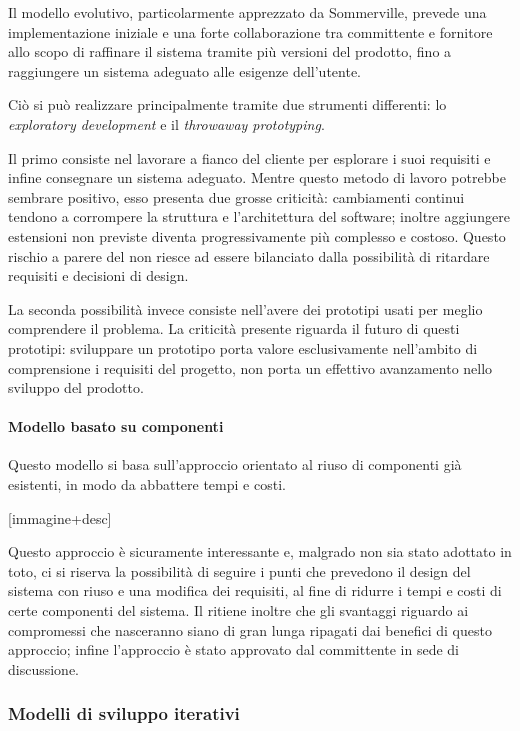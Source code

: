 			Il modello evolutivo, particolarmente apprezzato da Sommerville, prevede una implementazione iniziale e una forte collaborazione tra committente e fornitore allo scopo di raffinare il sistema tramite più versioni del prodotto, fino a raggiungere un sistema adeguato alle esigenze dell'utente.

Ciò si può realizzare principalmente tramite due strumenti differenti: lo \textit{exploratory development} e il \textit{throwaway prototyping}.

Il primo consiste nel lavorare a fianco del cliente per esplorare i suoi requisiti e infine consegnare un sistema adeguato. Mentre questo metodo di lavoro potrebbe sembrare positivo, esso presenta due grosse criticità: cambiamenti continui tendono a corrompere la struttura e l'architettura del software; inoltre aggiungere estensioni non previste diventa progressivamente più complesso e costoso. Questo rischio a parere del  non riesce ad essere bilanciato dalla possibilità di ritardare requisiti e decisioni di design.

La seconda possibilità invece consiste nell'avere dei prototipi usati per meglio comprendere il problema. La criticità presente riguarda il futuro di questi prototipi: sviluppare un prototipo porta valore esclusivamente nell'ambito di comprensione i requisiti del progetto, non porta un effettivo avanzamento nello sviluppo del prodotto.

			\paragraph{Modello basato su componenti}
Questo modello si basa sull'approccio orientato al riuso di componenti già esistenti, in modo da abbattere tempi e costi.

[immagine+desc]

Questo approccio è sicuramente interessante e, malgrado non sia stato adottato in toto, ci si riserva la possibilità di seguire i punti che prevedono il design del sistema con riuso e una modifica dei requisiti, al fine di ridurre i tempi e costi di certe componenti del sistema. Il  ritiene inoltre che gli svantaggi riguardo ai compromessi che nasceranno siano di gran lunga ripagati dai benefici di questo approccio; infine l'approccio è stato approvato dal committente in sede di discussione.

		\subsubsection{Modelli di sviluppo iterativi}

